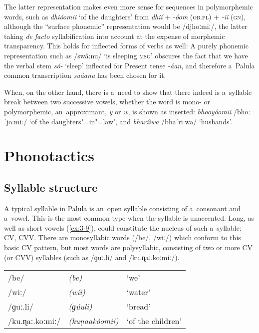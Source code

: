 The latter representation makes even more sense for sequences in polymorphemic words, such as \textit{dhióomii} `of the daughters' from \textit{dhií} + \textit{-óom} (\textsc{ob.pl)} + \textit{-ii} (\textsc{gn)}, although the ``surface phonemic'' representation would be /djhoːmiː/, the latter taking \textit{de facto} syllabification into account at the expense of morphemic transparency. This holds for inflected forms of verbs as well: A purely phonemic representation such as /swâːnu/ `is sleeping \textsc{msg}' obscures the fact that we have the verbal stem \textit{só-} `sleep' inflected for Present tense \textit{-áan}, and therefore a~Palula common transcription \textit{suáanu} has been chosen for it.


When, on the other hand, there is a~need to show that there indeed is a~syllable break between two successive vowels, whether the word is mono- or polymorphemic, an~approximant, \textit{y} or \textit{w}, is shown as inserted: \textit{bhooyóomii} /bhoːˈjoːmiː/ `of the daughters"=in"=law', and \textit{bharíiwa} /bhaˈriːwa/ `husbands'.


\section{Phonotactics}
\label{sec:3-3}

\subsection{Syllable structure}
\label{subsec:3-3-1}


A typical syllable in Palula is an~open syllable consisting of a~consonant and a~vowel. This is the most common type when the syllable is unaccented. Long, as well as short vowels (\ref{ex:3-9}), could constitute the nucleus of such a~syllable: CV, CVV. There are monosyllabic words (/be/, /wiː/) which conform to this basic CV pattern, but most words are polysyllabic, consisting of two or more CV (or CVV) syllables (such as /ɡuː.li/ and /ku.ɳaː.koːmiː/).


\begin{exe}
\extab
\label{ex:3-9}
\begin{tabular}{ l l l }
/be/ &
\textit{(be)} &
`we'\\
/wiː/ &
\textit{(wíi)} &
`water'\\
/ɡuː.li/ &
\textit{(ɡúuli)} &
`bread'\\
/ku.ɳaː.koːmiː/ &
\textit{(kuṇaakóomii)} &
`of the children'\\
\end{tabular}
\end{exe}



